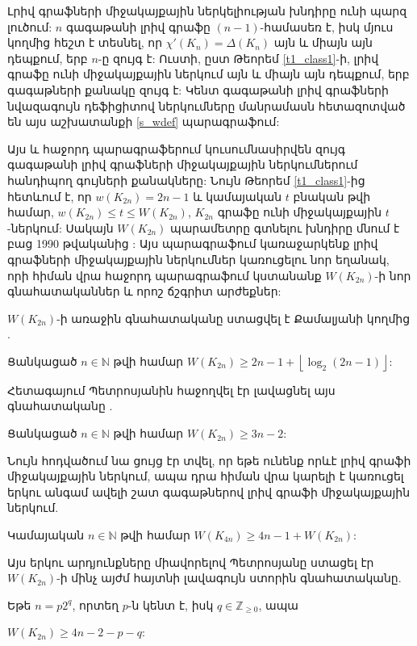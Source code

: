 Լրիվ գրաֆների միջակայքային ներկելիության խնդիրը ունի պարզ լուծում: $n$ գագաթանի լրիվ գրաֆը $(n-1)$-համասեռ է, իսկ մյուս կողմից հեշտ է տեսնել, որ $\chi'(K_n)=\Delta(K_n)$ այն և միայն այն դեպքում, երբ $n$-ը զույգ է: Ուստի, ըստ Թեորեմ \ref{t1_class1}-ի, լրիվ գրաֆը ունի միջակայքային ներկում այն և միայն այն դեպքում, երբ գագաթների քանակը զույգ է: Կենտ գագաթանի լրիվ գրաֆների նվազագույն դեֆիցիտով ներկումները մանրամասն հետազոտված են այս աշխատանքի \ref{s_wdef} պարագրաֆում:

Այս և հաջորդ պարագրաֆերում կուսումնասիրվեն զույգ գագաթանի լրիվ գրաֆների միջակայքային ներկումներում հանդիպող գույների քանակները: Նույն Թեորեմ \ref{t1_class1}-ից հետևում է, որ $w(K_{2n}) = 2n-1$ և կամայական $t$ բնական թվի համար, $w(K_{2n}) \leq t \leq W(K_{2n})$, $K_{2n}$ գրաֆը ունի միջակայքային $t$-ներկում: Սակայն $W(K_{2n})$ պարամետրը գտնելու խնդիրը մնում է բաց 1990 թվականից \cite{Kamalian1990}: Այս պարագրաֆում կառաջարկենք լրիվ գրաֆների միջակայքային ներկումներ կառուցելու նոր եղանակ, որի հիման վրա հաջորդ պարագրաֆում կստանանք $W(K_{2n})$-ի նոր գնահատականներ և որոշ ճշգրիտ արժեքներ:

$W(K_{2n})$-ի առաջին գնահատականը ստացվել է Քամալյանի կողմից \cite{Kamalian1990}.
\begin{theorem}
Ցանկացած $n\in \mathbb{N}$ թվի համար $W(K_{2n}) \geq 2n-1 + \left\lfloor \log_2(2n-1) \right\rfloor$:
\end{theorem}


Հետագայում Պետրոսյանին հաջողվել էր լավացնել այս գնահատականը \cite{Petrosyan2010}.
\begin{theorem}\label{tPetrosyan3n2}
Ցանկացած $n\in \mathbb{N}$ թվի համար $W(K_{2n}) \geq 3n-2$:
\end{theorem}

Նույն հոդվածում նա ցույց էր տվել, որ եթե ունենք որևէ լրիվ գրաֆի միջակայքային ներկում, ապա դրա հիման վրա կարելի է կառուցել երկու անգամ ավելի շատ գագաթներով լրիվ գրաֆի միջակայքային ներկում.

\begin{theorem}\label{tPetrosyan4n}
Կամայական $n\in \mathbb{N}$ թվի համար $W(K_{4n}) \geq 4n-1 + W(K_{2n})$:
\end{theorem}

Այս երկու արդյունքները միավորելով Պետրոսյանը ստացել էր $W(K_{2n})$-ի մինչ այժմ հայտնի լավագույն ստորին գնահատականը.
\begin{theorem}
\label{t2_complete_pq} Եթե $n=p2^{q}$, որտեղ $p$-ն կենտ է, իսկ $q \in \mathbb{Z}_{\geq 0}$, ապա
\begin{center}
$W\left(K_{2n}\right)\geq 4n-2-p-q$:
\end{center}
\end{theorem}

